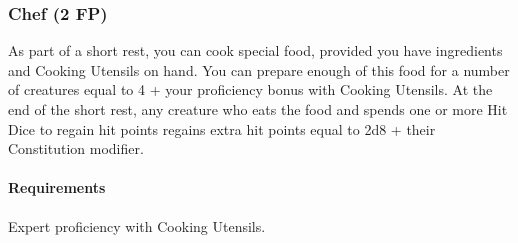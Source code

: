 \subsubsection{Chef (2 FP)} \label{feat::chef}
    As part of a short rest, you can cook special food, provided you have ingredients and Cooking Utensils on hand.
    You can prepare enough of this food for a number of creatures equal to 4 + your proficiency bonus with Cooking Utensils.
    At the end of the short rest, any creature who eats the food and spends one or more Hit Dice to regain hit points regains extra hit points equal to 2d8 + their Constitution modifier.
    \paragraph{Requirements} Expert proficiency with Cooking Utensils.

%

